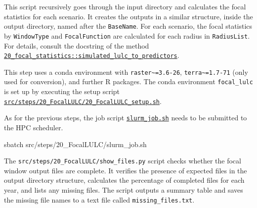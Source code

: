 \documentclass[
  letterpaper,
  DIV=11,
  numbers=noendperiod]{scrreprt}
\newenvironment{Shaded}{\begin{snugshade}}{\end{snugshade}}
\newcommand{\ExtensionTok}[1]{\textcolor[rgb]{0.00,0.23,0.31}{#1}}
\newcommand{\NormalTok}[1]{\textcolor[rgb]{0.00,0.23,0.31}{#1}}
\begin{document}
This script recursively goes through the input directory and calculates
the focal statistics for each scenario. It creates the outputs in a
similar structure, inside the output directory, named after the
\texttt{BaseName}. For each scenario, the focal statistics by
\texttt{WindowType} and \texttt{FocalFunction} are calculated for each
radius in \texttt{RadiusList}. For details, consult the docstring of the
method
\href{https://github.com/cbueth/Future-EI/blob/main/src/steps/20_FocalLULC/20_focal_statistics.R\#L260-L323}{\texttt{20\_focal\_statistics::simulated\_lulc\_to\_predictors}}.

This step uses a conda environment with
\texttt{raster\textasciitilde{}=3.6-26},
\texttt{terra\textasciitilde{}=1.7-71} (only used for conversion), and
further R packages. The conda environment \texttt{focal\_lulc} is set up
by executing the setup script\\
\href{https://github.com/cbueth/Future-EI/tree/main/src/steps/20_FocalLULC/20_FocalPrep_setup.sh}{\texttt{src/steps/20\_FocalLULC/20\_FocalLULC\_setup.sh}}.

As for the previous steps, the job script
\href{https://github.com/cbueth/Future-EI/tree/main/src/steps/20_FocalLULC/slurm_job.sh}{\texttt{slurm\_job.sh}}
needs to be submitted to the HPC scheduler.

\begin{Shaded}
\begin{Highlighting}[]
\ExtensionTok{sbatch}\NormalTok{ src/steps/20\_FocalLULC/slurm\_job.sh}
\end{Highlighting}
\end{Shaded}

\begin{tcolorbox}[enhanced jigsaw, breakable, bottomrule=.15mm, toprule=.15mm, rightrule=.15mm, opacitybacktitle=0.6, title=\textcolor{quarto-callout-note-color}{\faInfo}\hspace{0.5em}{Focal LULC output check}, coltitle=black, colback=white, titlerule=0mm, toptitle=1mm, left=2mm, bottomtitle=1mm, colbacktitle=quarto-callout-note-color!10!white, colframe=quarto-callout-note-color-frame, opacityback=0, leftrule=.75mm, arc=.35mm]

The \texttt{src/steps/20\_FocalLULC/show\_files.py} script checks
whether the focal window output files are complete. It verifies the
presence of expected files in the output directory structure, calculates
the percentage of completed files for each year, and lists any missing
files. The script outputs a summary table and saves the missing file
names to a text file called \texttt{missing\_files.txt}.

\end{tcolorbox}
\end{document}
